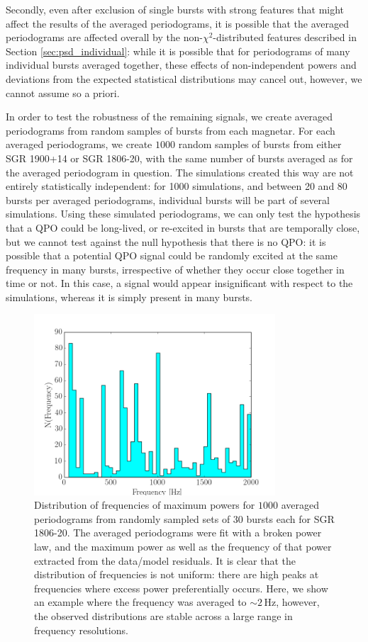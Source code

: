 \documentclass[numberedappendix]{emulateapj}
\newcommand{\hz}{\,\mathrm{Hz}}
\begin{document}
Secondly, even after exclusion of single bursts with strong features that might affect the results of the averaged periodograms, it is possible that the averaged periodograms are affected overall by the non-$\chi^2$-distributed features described in Section \ref{sec:psd_individual}: while it is possible that for periodograms of many individual bursts averaged together, these effects of non-independent powers and deviations from the expected statistical distributions may cancel out, however, we cannot assume so a priori. 

In order to test the robustness of the remaining signals, we create averaged periodograms from random samples of bursts from each magnetar. For each averaged periodograms, we create $1000$ random samples of bursts from either SGR 1900+14 or SGR 1806-20, with the same number of bursts averaged as for the averaged periodogram in question. The simulations created this way are not entirely statistically independent: for 1000 simulations, and between 20 and 80 bursts per averaged periodograms, individual bursts will be part of several simulations. Using these simulated periodograms, we can only test the hypothesis that a QPO could be long-lived, or re-excited in bursts that are temporally close, but we cannot test against the null hypothesis that there is no QPO: it is possible that a potential QPO signal could be randomly excited at the same frequency in many bursts, irrespective of whether they occur close together in time or not. In this case, a signal would appear insignificant with respect to the simulations, whereas it is simply present in many bursts. 

\begin{figure}[htbp]
\begin{center}
\includegraphics[width=9cm]{frequency_dist_example.png}
\caption{Distribution of frequencies of maximum powers for $1000$ averaged periodograms from randomly sampled sets of $30$ bursts each for SGR 1806-20. The averaged periodograms were fit with a broken power law, and the maximum power as well as the frequency of that power extracted from the data/model residuals. It is clear that the distribution of frequencies is not uniform: there are high peaks at frequencies where excess power preferentially occurs.  Here, we show an example where the frequency was averaged to $\sim 2 \hz$, however, the observed distributions are stable across a large range in frequency resolutions.}
\label{fig:psd_avg_freqdist}
\end{center}
\end{figure}
\end{document}
